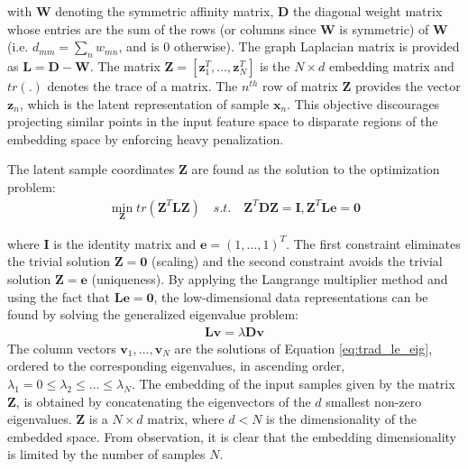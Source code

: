 \noindent
with $\bm{W}$ denoting the symmetric affinity matrix, $\bm{D}$ the diagonal weight matrix whose entries are the sum of the rows (or columns since $\bm{W}$ is symmetric) of $\bm{W}$ (i.e. $d_{mm} = \sum_{n}w_{mn}$, and is $0$ otherwise).  The graph Laplacian matrix is provided as $\bm{L} = \bm{D} - \bm{W}$.  The matrix $\bm{Z} = [\bm{z}^{T}_{1}, \dots, \bm{z}^{T}_{N}]$ is the $N \times d$ embedding matrix and $tr(.)$ denotes the trace of a matrix. The $n^{th}$ row of matrix $\bm{Z}$ provides the vector $\bm{z}_n$, which is the latent representation of sample  $\bm{x}_n$. This objective discourages projecting similar points in the input feature space to disparate regions of the embedding space by enforcing heavy penalization. 

The latent sample coordinates $\bm{Z}$ are found as the solution to the optimization problem:
\begin{align}
	\min_{\bm{Z}} tr(\bm{Z}^{T}\bm{L}\bm{Z}) \quad s.t. \quad \bm{Z}^{T}\bm{D}\bm{Z} = \bm{I}, \bm{Z}^{T}\bm{L}\bm{e} = \bm{0}
\end{align}

\noindent
where $\bm{I}$ is the identity matrix and $\bm{e} = (1, \dots, 1)^{T}$.  The first constraint eliminates the trivial solution $\bm{Z} = \bm{0}$ (scaling) and the second constraint avoids the trivial solution $\bm{Z} = \bm{e}$ (uniqueness). By applying the Langrange multiplier method and using the fact that $\bm{L}\bm{e} = \bm{0}$, the low-dimensional data representations can be found by solving the generalized eigenvalue problem:
\begin{align}
	\bm{L}\bm{v} = \lambda \bm{D} \bm{v} \label{eq:trad_le_eig}
\end{align}
\noindent
The column vectors $\bm{v}_{1}, \dots, \bm{v}_{N}$ are the solutions of Equation \ref{eq:trad_le_eig}, ordered to the corresponding eigenvalues, in ascending order, $\lambda_{1} = 0 \leq \lambda_{2} \leq \dots \leq \lambda_{N} $. The embedding of the input samples given by the matrix $\bm{Z}$, is obtained by concatenating the eigenvectors of the $d$ smallest non-zero eigenvalues.  $\bm{Z}$ is a $N \times d$ matrix, where $d < N$ is the dimensionality of the embedded space.  From observation, it is clear that the embedding dimensionality is limited by the number of samples $N$.

